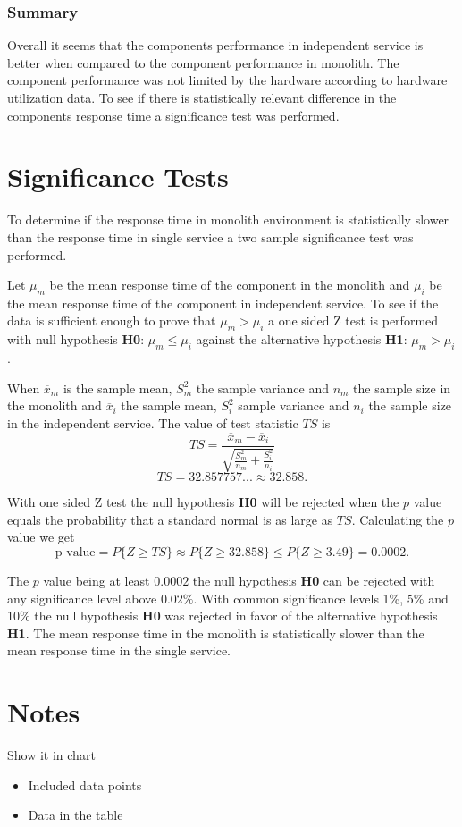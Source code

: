 \subsubsection{Summary}
Overall it seems that the components performance in independent service is better when compared to the component performance in monolith.
The component performance was not limited by the hardware according to hardware utilization data.
To see if there is statistically relevant difference in the components response time a significance test was performed.

\section{Significance Tests}
To determine if the response time in monolith environment is statistically slower than the response time in single service a two sample significance test was performed.

Let $\mu_m$ be the mean response time of the component in the monolith and $\mu_i$ be the mean response time of the component in independent service.
To see if the data is sufficient enough to prove that $\mu_m > \mu_i$ a one sided Z test is performed with null hypothesis \textbf{H0}: $\mu_m \leq \mu_i$ against the alternative hypothesis \textbf{H1}: $\mu_m > \mu_i$.

When $\overline{x}_m$ is the sample mean, $S_m^2$ the sample variance and $n_m$ the sample size in the monolith 
and $\overline{x}_i$ the sample mean, $S_i^2$ sample variance and $n_i$ the sample size in the independent service.
The value of test statistic $TS$ is
\[
TS=\frac{\overline{x}_m-\overline{x}_i}{\sqrt{\frac{S_m^2}{n_m}+\frac{S_i^2}{n_i}}}
\]
\[
TS=32.857757... \approx 32.858
.\]
 
With one sided Z test the null hypothesis \textbf{H0} will be rejected when the $p$ value 
equals the probability that a standard normal is as large as $TS$. Calculating the $p$ value we get %
\[
\text{p value} = P\{Z\geq TS\} \approx P\{Z\geq 32.858\} \leq P\{Z\geq 3.49\} = 0.0002
.\]

The $p$ value being at least $0.0002$ the null hypothesis \textbf{H0} can be rejected with any significance level above $0.02\%$.
With common significance levels 1\%, 5\% and 10\% the null hypothesis \textbf{H0} was rejected in favor of the alternative hypothesis \textbf{H1}.
The mean response time in the monolith is statistically slower than the mean response time in the single service.

\section{Notes}

Show it in chart
\begin{itemize}
    \item Included data points
    \item Data in the table
\end{itemize}